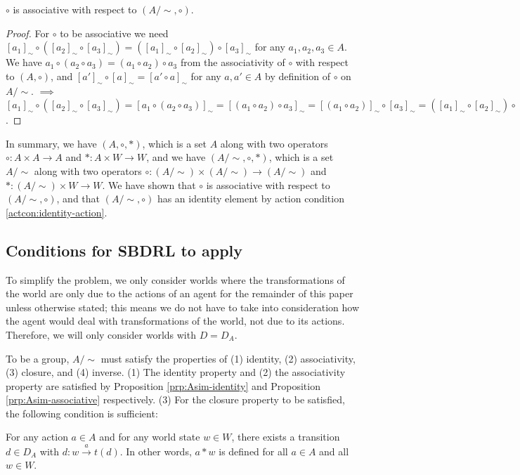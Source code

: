 	\begin{proposition}\label{prp:Asim-associative}
		$\circ$ is associative with respect to $(A/\sim, \circ)$.
	\end{proposition}
	\begin{proof}
		For $\circ$ to be associative we need $[a_{1}]_{\sim} \circ ([a_{2}]_{\sim} \circ [a_{3}]_{\sim}) = ([a_{1}]_{\sim} \circ [a_{2}]_{\sim}) \circ [a_{3}]_{\sim}$ for any $a_{1},a_{2},a_{3} \in A$.
		We have $a_{1} \circ (a_{2} \circ a_{3}) = (a_{1} \circ a_{2}) \circ a_{3}$ from the associativity of $\circ$ with respect to $(A, \circ)$, and $[a']_{\sim} \circ [a]_{\sim} = [a' \circ a]_{\sim}$ for any $a,a' \in A$ by definition of $\circ$ on $A/\sim$.
		$\implies$ $[a_{1}]_{\sim} \circ ([a_{2}]_{\sim} \circ [a_{3}]_{\sim}) = [a_{1} \circ (a_{2} \circ a_{3})]_{\sim} = [(a_{1} \circ a_{2}) \circ a_{3}]_{\sim} = [(a_{1} \circ a_{2})]_{\sim} \circ [a_{3}]_{\sim} = ([a_{1}]_{\sim} \circ [a_{2}]_{\sim}) \circ [a_{3}]_{\sim}$.
	\end{proof}

	In summary, we have $(A, \circ, *)$, which is a set $A$ along with two operators $\circ: A \times A \to A$ and $*: A \times W \to W$, and we have $(A/\sim, \circ, *)$, which is a set $A/\sim$ along with two operators $\circ: (A/\sim) \times (A/\sim) \to (A/\sim)$ and $*: (A/\sim) \times W \to W$.
	We have shown that $\circ$ is associative with respect to $(A/\sim, \circ)$, and that $(A/\sim, \circ)$ has an identity element by action condition \ref{actcon:identity-action}.


	\subsection{Conditions for SBDRL to apply}\label{sec:World conditions}

	To simplify the problem, we only consider worlds where the transformations of the world are only due to the actions of an agent for the remainder of this paper unless otherwise stated; this means we do not have to take into consideration how the agent would deal with transformations of the world, not due to its actions.
	Therefore, we will only consider worlds with $D = D_{A}$.

	To be a group, $A/\sim$ must satisfy the properties of (1) identity, (2) associativity, (3) closure, and (4) inverse.
	(1) The identity property and (2) the associativity property are satisfied by Proposition \ref{prp:Asim-identity} and Proposition \ref{prp:Asim-associative} respectively.
	(3) For the closure property to be satisfied, the following condition is sufficient:
	\begin{world_condition}\label{wldcon:unrestricted-actions}
		For any action $a \in A$ and for any world state $w \in W$, there exists a transition $d \in D_{A}$ with $d: w \xrightarrow{a} t(d)$.
		In other words, $a * w$ is defined for all $a \in A$ and all $w \in W$.

	\end{world_condition}

